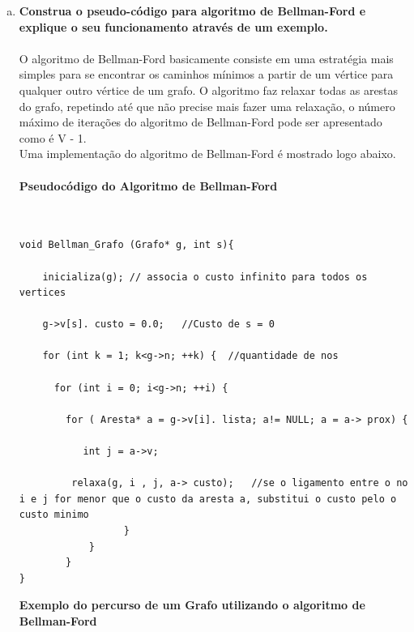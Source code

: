 \documentclass[11pt]{article} %
\begin{document}
\begin{enumerate}[a)]
\newpage

	\item
{\bf Construa o pseudo-código para algoritmo de Bellman-Ford e explique o seu funcionamento através de um exemplo.} \\ \\

\hspace*{1cm}O algoritmo de Bellman-Ford basicamente consiste em uma estratégia mais simples para se encontrar os caminhos mínimos a partir de um vértice para qualquer outro vértice de um grafo. O algoritmo faz relaxar todas as arestas do grafo, repetindo até que não precise mais fazer uma relaxação, o número máximo de iterações do algoritmo de Bellman-Ford pode ser apresentado como é V - 1. \\ Uma implementação do algoritmo de Bellman-Ford é mostrado logo abaixo. \\ \\

{\bf Pseudocódigo do Algoritmo de Bellman-Ford} \\ \\

\begin{lstlisting}

void Bellman_Grafo (Grafo* g, int s){

	inicializa(g); // associa o custo infinito para todos os vertices 
	
	g->v[s]. custo = 0.0;	//Custo de s = 0
	
	for (int k = 1; k<g->n; ++k) { 	//quantidade de nos
	
	  for (int i = 0; i<g->n; ++i) {
	
	    for ( Aresta* a = g->v[i]. lista; a!= NULL; a = a-> prox) {
	
	       int j = a->v;
	
	     relaxa(g, i , j, a-> custo); 	//se o ligamento entre o no i e j for menor que o custo da aresta a, substitui o custo pelo o custo minimo
	              }
	        }
	    }
}

\end{lstlisting}

\newpage

{\bf Exemplo do percurso de um Grafo utilizando o algoritmo de Bellman-Ford} 


\end{enumerate}
\end{document}
